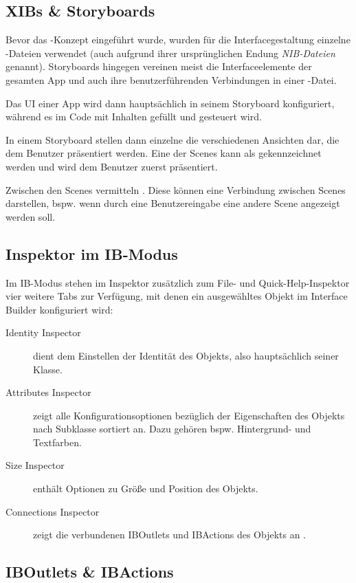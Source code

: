 \documentclass[parskip=half, final]{scrreprt}
\begin{document}
\subsection{XIBs \& Storyboards}

Bevor das -Konzept eingeführt wurde, wurden für die Interfacegestaltung einzelne -Dateien verwendet (auch aufgrund ihrer ursprünglichen Endung \emph{NIB-Dateien} genannt). Storyboards hingegen vereinen meist die Interfaceelemente der gesamten App und auch ihre benutzerführenden Verbindungen in einer -Datei.

Das UI einer App wird dann hauptsächlich in seinem Storyboard konfiguriert, während es im Code mit Inhalten gefüllt und gesteuert wird.

In einem Storyboard stellen dann einzelne  die verschiedenen Ansichten dar, die dem Benutzer präsentiert werden. Eine der Scenes kann als  gekennzeichnet werden und wird dem Benutzer zuerst präsentiert.

Zwischen den Scenes vermitteln . Diese können eine Verbindung zwischen Scenes darstellen, bspw. wenn durch eine Benutzereingabe eine andere Scene angezeigt werden soll.

\subsection{Inspektor im IB-Modus}\label{sec:ibinspector}

Im IB-Modus stehen im Inspektor zusätzlich zum File- und Quick-Help-Inspektor  vier weitere Tabs zur Verfügung, mit denen ein ausgewähltes Objekt im Interface Builder konfiguriert wird:
\begin{description}
\item[Identity Inspector] dient dem Einstellen der Identität des Objekts, also hauptsächlich seiner Klasse.
\item[Attributes Inspector] zeigt alle Konfigurationsoptionen bezüglich der Eigenschaften des Objekts nach Subklasse sortiert an. Dazu gehören bspw. Hintergrund- und Textfarben.
\item[Size Inspector] enthält Optionen zu Größe und Position des Objekts.
\item[Connections Inspector] zeigt die verbundenen IBOutlets und IBActions des Objekts an .
\end{description}

\subsection{IBOutlets \& IBActions}\label{sec:iboutletsibactions}
\end{document}
